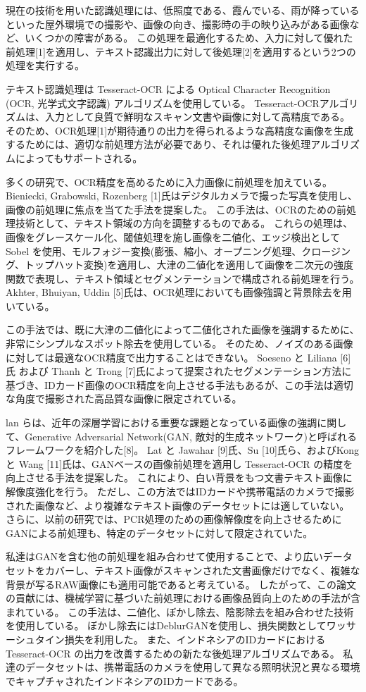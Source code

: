 \documentclass[uplatex, twocolumn,10pt]{jsarticle}
\begin{document}
現在の技術を用いた認識処理には、低照度である、霞んでいる、雨が降っているといった屋外環境での撮影や、画像の向き、撮影時の手の映り込みがある画像など、いくつかの障害がある。
この処理を最適化するため、入力に対して優れた前処理[1]を適用し、テキスト認識出力に対して後処理[2]を適用するという2つの処理を実行する。

テキスト認識処理は Tesseract-OCR による Optical Character Recognition (OCR, 光学式文字認識) アルゴリズムを使用している。
Tesseract-OCRアルゴリズムは、入力として良質で鮮明なスキャン文書や画像に対して高精度である。
そのため、OCR処理[1]が期待通りの出力を得られるような高精度な画像を生成するためには、適切な前処理方法が必要であり、それは優れた後処理アルゴリズムによってもサポートされる。

多くの研究で、OCR精度を高めるために入力画像に前処理を加えている。
Bieniecki, Grabowski, Rozenberg [1]氏はデジタルカメラで撮った写真を使用し、画像の前処理に焦点を当てた手法を提案した。
この手法は、OCRのための前処理技術として、テキスト領域の方向を調整するものである。
これらの処理は、画像をグレースケール化、閾値処理を施し画像を二値化、エッジ検出として Sobel を使用、モルフォジー変換(膨張、縮小、オープニング処理、クロージング、トップハット変換)を適用し、大津の二値化を適用して画像を二次元の強度関数で表現し、テキスト領域とセグメンテーションで構成される前処理を行う。
Akhter, Bhuiyan, Uddin [5]氏は、OCR処理においても画像強調と背景除去を用いている。

この手法では、既に大津の二値化によって二値化された画像を強調するために、非常にシンプルなスポット除去を使用している。
そのため、ノイズのある画像に対しては最適なOCR精度で出力することはできない。
Soeseno と Liliana [6]氏 および Thanh と Trong [7]氏によって提案されたセグメンテーション方法に基づき、IDカード画像のOCR精度を向上させる手法もあるが、この手法は適切な角度で撮影された高品質な画像に限定されている。

lan らは、近年の深層学習における重要な課題となっている画像の強調に関して、Generative Adversarial Network(GAN, 敵対的生成ネットワーク)と呼ばれるフレームワークを紹介した[8]。
Lat と Jawahar [9]氏、Su [10]氏ら、およびKong と Wang [11]氏は、GANベースの画像前処理を適用し Tesseract-OCR の精度を向上させる手法を提案した。
これにより、白い背景をもつ文書テキスト画像に解像度強化を行う。
ただし、この方法ではIDカードや携帯電話のカメラで撮影された画像など、より複雑なテキスト画像のデータセットには適していない。
さらに、以前の研究では、PCR処理のための画像解像度を向上させるためにGANによる前処理も、特定のデータセットに対して限定されていた。

私達はGANを含む他の前処理を組み合わせて使用することで、より広いデータセットをカバーし、テキスト画像がスキャンされた文書画像だけでなく、複雑な背景が写るRAW画像にも適用可能であると考えている。
したがって、この論文の貢献には、機械学習に基づいた前処理における画像品質向上のための手法が含まれている。
この手法は、二値化、ぼかし除去、陰影除去を組み合わせた技術を使用している。
ぼかし除去にはDeblurGANを使用し、損失関数としてワッサーシュタイン損失を利用した。
また、インドネシアのIDカードにおける Tesseract-OCR の出力を改善するための新たな後処理アルゴリズムである。
私達のデータセットは、携帯電話のカメラを使用して異なる照明状況と異なる環境でキャプチャされたインドネシアのIDカードである。
\end{document}
